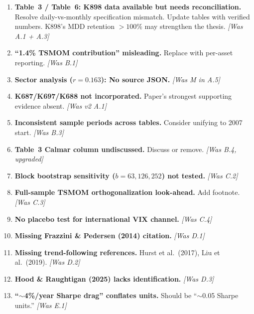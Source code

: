 \documentclass[12pt,a4paper]{article}
\begin{document}
\begin{enumerate}[label=\textcolor{medsev}{\textbf{M\arabic*}}]

\item \textbf{Table~3 / Table~6: K898 data available but needs reconciliation.} Resolve daily-vs-monthly specification mismatch. Update tables with verified numbers. K898's MDD retention $>100\%$ may strengthen the thesis. \textit{[Was A.1 + A.3]}

\item \textbf{``1.4\% TSMOM contribution'' misleading.} Replace with per-asset reporting. \textit{[Was B.1]}

\item \textbf{Sector analysis ($r = 0.163$): No source JSON.} \textit{[Was M in A.5]}

\item \textbf{K687/K697/K688 not incorporated.} Paper's strongest supporting evidence absent. \textit{[Was v2 A.1]}

\item \textbf{Inconsistent sample periods across tables.} Consider unifying to 2007 start. \textit{[Was B.3]}

\item \textbf{Table~3 Calmar column undiscussed.} Discuss or remove. \textit{[Was B.4, upgraded]}

\item \textbf{Block bootstrap sensitivity ($b = 63, 126, 252$) not tested.} \textit{[Was C.2]}

\item \textbf{Full-sample TSMOM orthogonalization look-ahead.} Add footnote. \textit{[Was C.3]}

\item \textbf{No placebo test for international VIX channel.} \textit{[Was C.4]}

\item \textbf{Missing Frazzini \& Pedersen (2014) citation.} \textit{[Was D.1]}

\item \textbf{Missing trend-following references.} Hurst et al.\ (2017), Liu et al.\ (2019). \textit{[Was D.2]}

\item \textbf{Hood \& Raughtigan (2025) lacks identification.} \textit{[Was D.3]}

\item \textbf{``$\sim$4\%/year Sharpe drag'' conflates units.} Should be ``$\sim$0.05 Sharpe units.'' \textit{[Was E.1]}

\end{enumerate}
\end{document}
